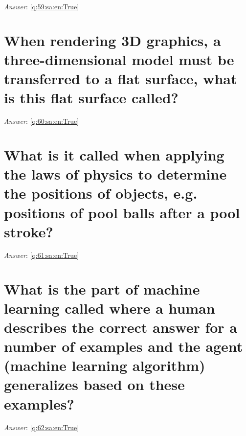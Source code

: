 \documentclass[a4paper,11pt,oneside]{book}
\begin{document}
\begin{sloppypar}
\textit{Answer}: \autoref{q:59:sa:en:True}



\section{When rendering 3D graphics, a three-dimensional model must be transferred to a flat surface, what is this flat surface called?}

\label{q:60:sa:en:False}

\vspace{2cm}

\noindent\makebox[\textwidth]{\hrulefill}

\vspace{1cm}

\textit{Answer}: \autoref{q:60:sa:en:True}



\section{What is it called when applying the laws of physics to determine the positions of objects, e.g. positions of pool balls after a pool stroke?}

\label{q:61:sa:en:False}

\vspace{2cm}

\noindent\makebox[\textwidth]{\hrulefill}

\vspace{1cm}

\textit{Answer}: \autoref{q:61:sa:en:True}



\section{What is the part of machine learning called where a human describes the correct answer for a number of examples and the agent (machine learning algorithm) generalizes based on these examples?}

\label{q:62:sa:en:False}

\vspace{2cm}

\noindent\makebox[\textwidth]{\hrulefill}

\vspace{1cm}

\textit{Answer}: \autoref{q:62:sa:en:True}




\end{sloppypar}
\end{document}
